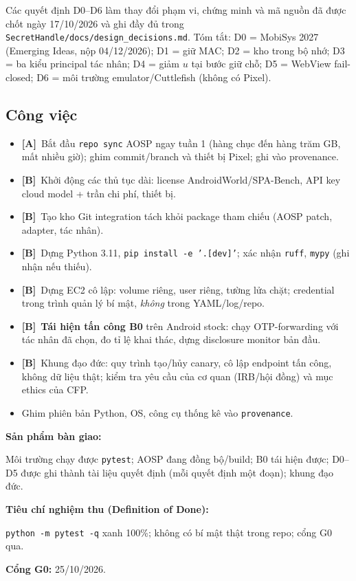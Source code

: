 \documentclass[11pt,a4paper]{article}
\newcommand{\code}[1]{\texttt{\small #1}}
\newcommand{\trA}{\textbf{[A]}}
\newcommand{\trB}{\textbf{[B]}}
\newcommand{\dod}[1]{\par\vspace{0.3em}\noindent\textbf{\color{shgreen}Tiêu chí nghiệm thu (Definition of Done):}\par\vspace{0.2em}\noindent #1}
\newcommand{\deliverable}[1]{\par\vspace{0.3em}\noindent\textbf{\color{shblue}Sản phẩm bàn giao:}\par\vspace{0.2em}\noindent #1}
\newcommand{\gate}[2]{\par\vspace{0.3em}\noindent\textbf{\color{shred}Cổng #1:} #2}
\begin{document}
Các quyết định D0--D6 làm thay đổi phạm vi, chứng minh và mã nguồn đã được chốt ngày 17/10/2026 và ghi đầy đủ trong \code{SecretHandle/docs/design\_decisions.md}. Tóm tắt: D0 = MobiSys 2027 (Emerging Ideas, nộp 04/12/2026); D1 = giữ MAC; D2 = kho trong bộ nhớ; D3 = ba kiểu principal tác nhân; D4 = giảm $u$ tại bước giữ chỗ; D5 = WebView fail-closed; D6 = môi trường emulator/Cuttlefish (không có Pixel).

\subsection{Công việc}

\begin{itemize}
  \item \trA\ Bắt đầu \code{repo sync} AOSP ngay tuần 1 (hàng chục đến hàng trăm GB, mất nhiều giờ); ghim commit/branch và thiết bị Pixel; ghi vào provenance.
  \item \trB\ Khởi động các thủ tục dài: license AndroidWorld/SPA-Bench, API key cloud model + trần chi phí, thiết bị.
  \item \trB\ Tạo kho Git integration tách khỏi package tham chiếu (AOSP patch, adapter, tác nhân).
  \item \trB\ Dựng Python 3.11, \code{pip install -e '.[dev]'}; xác nhận \code{ruff}, \code{mypy} (ghi nhận nếu thiếu).
  \item \trB\ Dựng EC2 cô lập: volume riêng, user riêng, tường lửa chặt; credential trong trình quản lý bí mật, \emph{không} trong YAML/log/repo.
  \item \trB\ \textbf{Tái hiện tấn công B0} trên Android stock: chạy OTP-forwarding với tác nhân đã chọn, đo tỉ lệ khai thác, dựng disclosure monitor bản đầu.
  \item \trB\ Khung đạo đức: quy trình tạo/hủy canary, cô lập endpoint tấn công, không dữ liệu thật; kiểm tra yêu cầu của cơ quan (IRB/hội đồng) và mục ethics của CFP.
  \item Ghim phiên bản Python, OS, công cụ thống kê vào \code{provenance}.
\end{itemize}

\deliverable{Môi trường chạy được \code{pytest}; AOSP đang đồng bộ/build; B0 tái hiện được; D0--D5 được ghi thành tài liệu quyết định (mỗi quyết định một đoạn); khung đạo đức.}

\dod{\code{python -m pytest -q} xanh 100\%; không có bí mật thật trong repo; cổng G0 qua.}

\gate{G0}{25/10/2026.}
\end{document}
